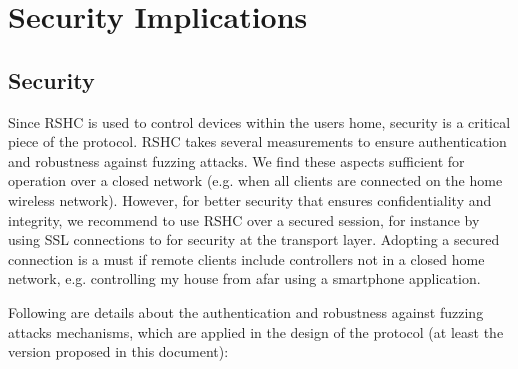 \section{Security Implications}
\label{sec:security}

\subsection{Security}
\label{sec:security:sec}

Since RSHC is used to control devices within the users home, security is a critical piece of the protocol. RSHC takes several measurements to ensure authentication and robustness against fuzzing attacks. We find these aspects sufficient for operation over a closed network (e.g. when all clients are connected on the home wireless network). However, for better security that ensures confidentiality and integrity, we recommend to use RSHC over a secured session, for instance by using SSL connections to for security at the transport layer. Adopting a secured connection is a must if remote clients include controllers not in a closed home network, e.g. controlling my house from afar using a smartphone application.

Following are details about the authentication and robustness against fuzzing attacks mechanisms, which are applied in the design of the protocol (at least the version proposed in this document):

